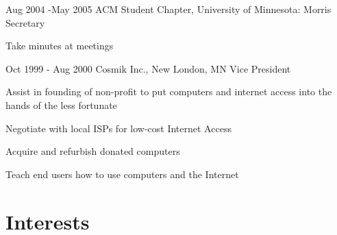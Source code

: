 \documentclass[10pt]{article} %
\begin{document}
\job
{Aug 2004 -}{May 2005}
{ACM Student Chapter, University of Minnesota: Morris}
{}
{Secretary}
{
\begin{itemize-noindent}
\item{Take minutes at meetings}
\end{itemize-noindent}
}

\job
{Oct 1999 - }{Aug 2000}
{Cosmik Inc., New London, MN}
{}
{Vice President}
{

\begin{itemize-noindent}
\item{Assist in founding of non-profit to put computers and internet access into the hands of the less fortunate}
\item{Negotiate with local ISPs for low-cost Internet Access}
\item{Acquire and refurbish donated computers}
\item{Teach end users how to use computers and the Internet}
\end{itemize-noindent}
}


\section{Interests}


\end{document}
